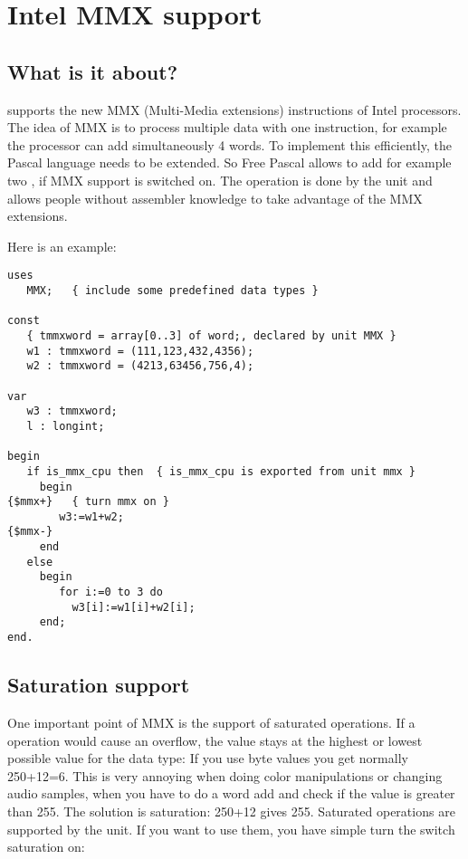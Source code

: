 \chapter{Intel MMX support}
\label{ch:MMXSupport}

\section{What is it about?}
\label{se:WhatisMMXabout}
\fpc supports the new MMX (Multi-Media extensions)
instructions of Intel processors. The idea of MMX is to
process multiple data with one instruction, for example the processor
can add simultaneously 4 words. To implement this efficiently, the
Pascal language needs to be extended. So Free Pascal allows
to add for example two ,
if MMX support is switched on. The operation is done
by the  unit and allows people without assembler knowledge to take
advantage of the MMX extensions.

Here is an example:
\begin{verbatim}
uses
   MMX;   { include some predefined data types }

const
   { tmmxword = array[0..3] of word;, declared by unit MMX }
   w1 : tmmxword = (111,123,432,4356);
   w2 : tmmxword = (4213,63456,756,4);

var
   w3 : tmmxword;
   l : longint;

begin
   if is_mmx_cpu then  { is_mmx_cpu is exported from unit mmx }
     begin
{$mmx+}   { turn mmx on }
        w3:=w1+w2;
{$mmx-}
     end
   else
     begin
        for i:=0 to 3 do
          w3[i]:=w1[i]+w2[i];
     end;
end.
\end{verbatim}

\section{Saturation support}
\label{se:SaturationSupport}

One important point of MMX is the support of saturated operations.
If a operation would cause an overflow, the value stays at the
highest or lowest possible value for the data type:
If you use byte values you get normally 250+12=6. This is very
annoying when doing color manipulations or changing audio samples,
when you have to do a word add and check if the value is greater than
255. The solution is saturation: 250+12 gives 255.
Saturated operations are supported by the  unit. If you
want to use them, you have simple turn the switch saturation on:

